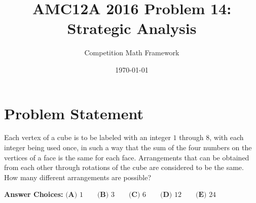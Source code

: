 \documentclass[]{article}
\begin{document}
\title{AMC12A 2016 Problem 14:\\Strategic Analysis}
\author{Competition Math Framework}
\date{\today}
\maketitle

\section*{Problem Statement}
Each vertex of a cube is to be labeled with an integer $1$ through $8$, with each integer being used once, in such a way that the sum of the four numbers on the vertices of a face is the same for each face. Arrangements that can be obtained from each other through rotations of the cube are considered to be the same. How many different arrangements are possible?

\textbf{Answer Choices:}
$\textbf{(A) } 1\qquad\textbf{(B) } 3\qquad\textbf{(C) }6 \qquad\textbf{(D) }12 \qquad\textbf{(E) }24$
\end{document}
